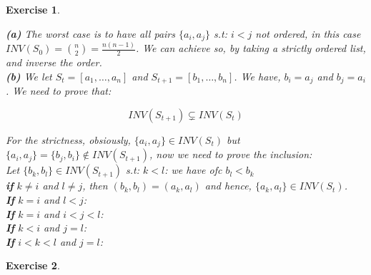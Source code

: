\documentclass{article}
\newtheorem{exo}{Exercise}
\begin{document}
\begin{exo}{\ \\}


\noindent
\textbf{(a)} The worst case is to have all pairs $\{a_i,a_j\}$ s.t: $i<j$ not ordered, in this case $INV(S_0) = \binom{n}{2} = \frac{n(n-1)}{2}$. We can achieve so, by taking a strictly ordered list, and inverse the order. \\

\noindent
\textbf{(b)} We let $S_t = [a_1, \dots, a_n]$ and $S_{t+1} = [b_1, \dots, b_n]$. We have, $b_i = a_j$ and $b_j = a_i$. We need to prove that:

\[ INV(S_{t+1}) \subsetneq  INV(S_{t}) \]

For the strictness, obsiously, $\{a_i, a_j\} \in INV(S_t)$ but $\{a_i, a_j\} = \{b_j, b_i\} \notin INV(S_{t+1})$, now we need to prove the inclusion: \\

Let $\{b_k, b_l\} \in INV(S_{t+1})$ s.t: $k < l$: we have ofc $b_l < b_k$ \\

\textbf{if} $k \neq i$ and $l \neq j$, then $(b_k, b_l) = (a_k, a_l)$ and hence, $\{a_k, a_l\} \in INV(S_t)$. \\

\textbf{If} $k=i$ and $l < j$:  \\

\textbf{If} $k=i$ and $i <  j < l$:  \\

\textbf{If} $k < i$ and $j = l$: \\
\textbf{If} $i<k<l$ and $j = l$: \\



\end{exo}

\begin{exo}{\ \\}

\end{exo}
\end{document}

